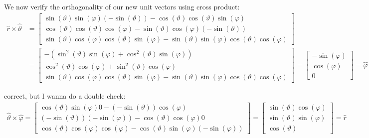 \documentclass[11pt,a4paper]{article}
\begin{document}
\begin{enumerate}
\newpage

We now verify the orthogonality of our new unit vectors using cross product:
\begin{align*}
\hat{r}\times\hat{\vartheta}
&=
\begin{bmatrix}
\sin(\vartheta)\sin(\varphi)(-\sin(\vartheta))-\cos(\vartheta)\cos(\vartheta)\sin(\varphi) \\
\cos(\vartheta)\cos(\vartheta)\cos(\varphi)-\sin(\vartheta)\cos(\varphi)(-\sin(\vartheta)) \\
\sin(\vartheta)\cos(\varphi)\cos(\vartheta)\sin(\varphi)-\sin(\vartheta)\sin(\varphi)\cos(\vartheta)\cos(\varphi)
\end{bmatrix}\\
&=
\begin{bmatrix}
-(\sin^2(\vartheta)\sin(\varphi)+\cos^2(\vartheta)\sin(\varphi)) \\
\cos^2(\vartheta)\cos(\varphi)+\sin^2(\vartheta)\cos(\varphi) \\
\sin(\vartheta)\cos(\varphi)\cos(\vartheta)\sin(\varphi)-\sin(\vartheta)\sin(\varphi)\cos(\vartheta)\cos(\varphi)
\end{bmatrix}
=
\begin{bmatrix}
-\sin(\varphi) \\
\cos(\varphi) \\
0
\end{bmatrix}
=\hat{\varphi}
\end{align*}

correct, but I wanna do a double check:
\begin{align*}
\hat{\vartheta}\times\hat{\varphi}
=
\begin{bmatrix}
\cos(\vartheta)\sin(\varphi)0-(-\sin(\vartheta))\cos(\varphi) \\
(-\sin(\vartheta))(-\sin(\varphi))-\cos(\vartheta)\cos(\varphi)0 \\
\cos(\vartheta)\cos(\varphi)\cos(\varphi)-\cos(\vartheta)\sin(\varphi)(-\sin(\varphi))
\end{bmatrix}
=
\begin{bmatrix}
\sin(\vartheta)\cos(\varphi) \\
\sin(\vartheta)\sin(\varphi) \\
\cos(\vartheta)
\end{bmatrix}
=\hat{r}
\end{align*}



\end{enumerate}
\end{document}
